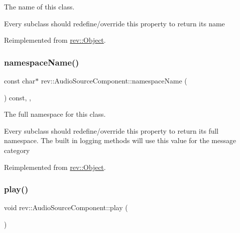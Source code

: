 The name of this class. 

Every subclass should redefine/override this property to return its name 

Reimplemented from \mbox{\hyperlink{classrev_1_1_object_a7a2013f91169479b65cf93afdc5d9a68}{rev\+::\+Object}}.

\mbox{\label{classrev_1_1_audio_source_component_ae94612b38966493a4680deea4ba58792}} 
\subsubsection{\texorpdfstring{namespaceName()}{namespaceName()}}
{\footnotesize\ttfamily const char$\ast$ rev\+::\+Audio\+Source\+Component\+::namespace\+Name (\begin{DoxyParamCaption}{ }\end{DoxyParamCaption}) const\hspace{0.3cm}{\ttfamily [inline]}, {\ttfamily [override]}, {\ttfamily [virtual]}}



The full namespace for this class. 

Every subclass should redefine/override this property to return its full namespace. The built in logging methods will use this value for the message category 

Reimplemented from \mbox{\hyperlink{classrev_1_1_object_aaeb638d3e10f361c56c211a318a27f3d}{rev\+::\+Object}}.

\mbox{\label{classrev_1_1_audio_source_component_ab2032a3b5420196c9be07659d20c304f}} 
\subsubsection{\texorpdfstring{play()}{play()}}
{\footnotesize\ttfamily void rev\+::\+Audio\+Source\+Component\+::play (\begin{DoxyParamCaption}{ }\end{DoxyParamCaption})\hspace{0.3cm}{\ttfamily [protected]}}



